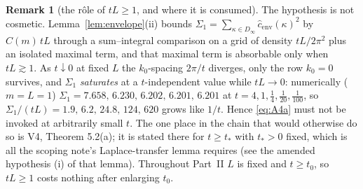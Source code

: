 \documentclass[11pt,a4paper]{article}
\theoremstyle{plain}
\theoremstyle{definition}
\newtheorem*{remarknn}{Remark}
\begin{document}
\begin{remarknn}[the r\^ole of $tL\ge1$, and where it is consumed]
The hypothesis is not cosmetic. Lemma~\ref{lem:envelope}(ii) bounds
$\Sigma_1=\sum_{\kappa\in D_\infty}\hat c_{\mathrm{env}}(\kappa)^2$ by $C(m)\,tL$
through a sum--integral comparison on a grid of density $tL/2\pi^2$ plus an isolated
maximal term, and that maximal term is absorbable only when $tL\gtrsim1$. As
$t\downarrow0$ at fixed $L$ the $k_0$-spacing $2\pi/t$ diverges, only the row $k_0=0$
survives, and $\Sigma_1$ \emph{saturates} at a $t$-independent value while $tL\to0$:
numerically ($m=L=1$) $\Sigma_1=7.658,\,6.230,\,6.202,\,6.201,\,6.201$ at
$t=4,1,\tfrac14,\tfrac1{20},\tfrac1{100}$, so $\Sigma_1/(tL)=1.9,\,6.2,\,24.8,\,124,\,620$
grows like $1/t$. Hence \eqref{eq:A4a} must not be invoked at arbitrarily small $t$.
The one place in the chain that would otherwise do so is V4, Theorem 5.2(a); it is
stated there for $t\ge t_*$ with $t_*>0$ fixed, which is all the scoping note's
Laplace-transfer lemma requires (see the amended hypothesis (i) of that lemma).
Throughout Part~II $L$ is fixed and $t\ge t_0$, so $tL\ge1$ costs nothing after
enlarging $t_0$.
\end{remarknn}
\end{document}
